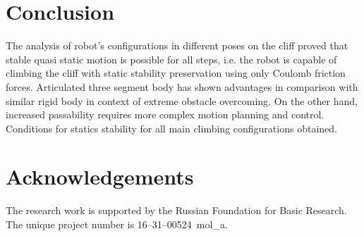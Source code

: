 \documentclass{ws-procs9x6}
\begin{document}
\section{Conclusion}
The analysis of robot's configurations in different poses on the cliff proved that stable quasi static motion is possible for all steps, i.e. the robot is capable of climbing the cliff with static stability preservation using only Coulomb friction forces. Articulated three segment body has shown advantages in comparison with similar rigid body in context of extreme obstacle overcoming. On the other hand, increased passability requires more complex motion planning and control.
Conditions for statics stability for all main climbing configurations obtained.


\section*{Acknowledgements}
The research work is supported by the Russian Foundation for Basic Research. The unique project number is 16--31--00524~mol\_a.
\end{document}
